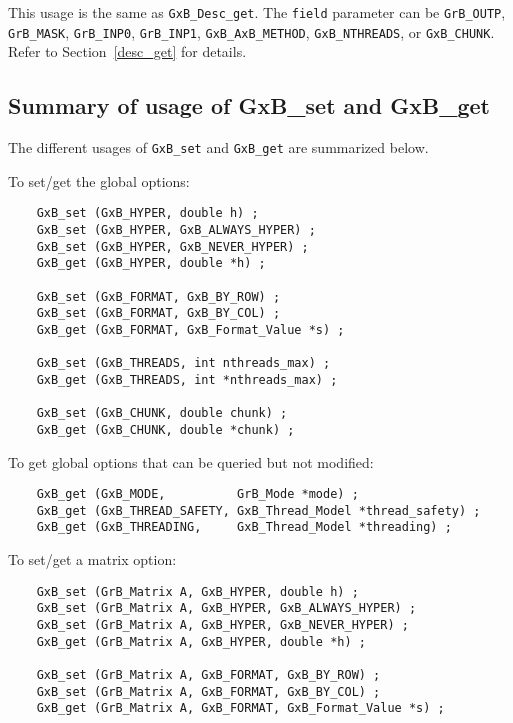 \documentclass[12pt]{article}
\begin{document}
This usage is the same as \verb'GxB_Desc_get'.  The \verb'field' parameter can
be \verb'GrB_OUTP', \verb'GrB_MASK', \verb'GrB_INP0', \verb'GrB_INP1',
\verb'GxB_AxB_METHOD',
\verb'GxB_NTHREADS', or \verb'GxB_CHUNK'.
Refer to Section~\ref{desc_get} for details.

\newpage
\subsection{Summary of usage of {\sf GxB\_set} and {\sf GxB\_get}}

The different usages of \verb'GxB_set' and \verb'GxB_get' are summarized below.

\noindent
To set/get the global options:

    {\footnotesize
    \begin{verbatim}
    GxB_set (GxB_HYPER, double h) ;
    GxB_set (GxB_HYPER, GxB_ALWAYS_HYPER) ;
    GxB_set (GxB_HYPER, GxB_NEVER_HYPER) ;
    GxB_get (GxB_HYPER, double *h) ;

    GxB_set (GxB_FORMAT, GxB_BY_ROW) ;
    GxB_set (GxB_FORMAT, GxB_BY_COL) ;
    GxB_get (GxB_FORMAT, GxB_Format_Value *s) ;

    GxB_set (GxB_THREADS, int nthreads_max) ;
    GxB_get (GxB_THREADS, int *nthreads_max) ;

    GxB_set (GxB_CHUNK, double chunk) ;
    GxB_get (GxB_CHUNK, double *chunk) ; \end{verbatim} }

\noindent
To get global options that can be queried but not modified:

    {\footnotesize
    \begin{verbatim}
    GxB_get (GxB_MODE,          GrB_Mode *mode) ;
    GxB_get (GxB_THREAD_SAFETY, GxB_Thread_Model *thread_safety) ;
    GxB_get (GxB_THREADING,     GxB_Thread_Model *threading) ; \end{verbatim} }

\noindent
To set/get a matrix option:

    {\footnotesize
    \begin{verbatim}
    GxB_set (GrB_Matrix A, GxB_HYPER, double h) ;
    GxB_set (GrB_Matrix A, GxB_HYPER, GxB_ALWAYS_HYPER) ;
    GxB_set (GrB_Matrix A, GxB_HYPER, GxB_NEVER_HYPER) ;
    GxB_get (GrB_Matrix A, GxB_HYPER, double *h) ;

    GxB_set (GrB_Matrix A, GxB_FORMAT, GxB_BY_ROW) ;
    GxB_set (GrB_Matrix A, GxB_FORMAT, GxB_BY_COL) ;
    GxB_get (GrB_Matrix A, GxB_FORMAT, GxB_Format_Value *s) ; \end{verbatim} }
\end{document}
